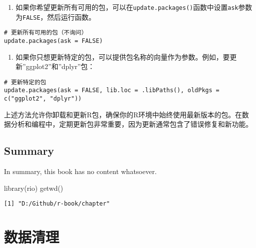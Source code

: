 \documentclass[
  letterpaper,
  DIV=11,
  numbers=noendperiod]{scrreprt}
\newenvironment{Shaded}{\begin{snugshade}}{\end{snugshade}}
\newcommand{\FunctionTok}[1]{\textcolor[rgb]{0.28,0.35,0.67}{#1}}
\newcommand{\NormalTok}[1]{\textcolor[rgb]{0.00,0.23,0.31}{#1}}
\providecommand{\tightlist}{%
  \setlength{\itemsep}{0pt}\setlength{\parskip}{0pt}}\usepackage{longtable,booktabs,array}
\begin{document}
\begin{enumerate}
\def\labelenumi{\arabic{enumi}.}
\setcounter{enumi}{1}
\tightlist
\item
  如果你希望更新所有可用的包，可以在\texttt{update.packages()}函数中设置\texttt{ask}参数为\texttt{FALSE}，然后运行函数。
\end{enumerate}

\begin{verbatim}
# 更新所有可用的包（不询问）
update.packages(ask = FALSE)
\end{verbatim}

\begin{enumerate}
\def\labelenumi{\arabic{enumi}.}
\setcounter{enumi}{2}
\tightlist
\item
  如果你只想更新特定的包，可以提供包名称的向量作为参数。例如，要更新''ggplot2''和''dplyr''包：
\end{enumerate}

\begin{verbatim}
# 更新特定的包
update.packages(ask = FALSE, lib.loc = .libPaths(), oldPkgs = c("ggplot2", "dplyr"))
\end{verbatim}

上述方法允许你卸载和更新R包，确保你的R环境中始终使用最新版本的包。在数据分析和编程中，定期更新包非常重要，因为更新通常包含了错误修复和新功能。

\hypertarget{summary}{%
\chapter{Summary}\label{summary}}

In summary, this book has no content whatsoever.

\begin{Shaded}
\begin{Highlighting}[]
\FunctionTok{library}\NormalTok{(rio)}
\FunctionTok{getwd}\NormalTok{()}
\end{Highlighting}
\end{Shaded}

\begin{verbatim}
[1] "D:/Github/r-book/chapter"
\end{verbatim}

\part{数据清理}

\hypertarget{section}{%
\chapter{}\label{section}}
\end{document}
